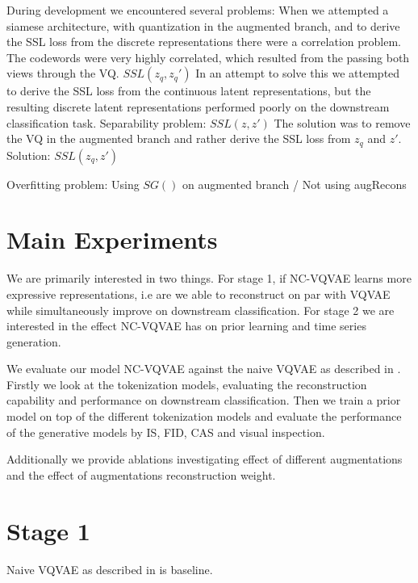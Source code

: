 \documentclass[../../thesis.tex]{subfiles}
\begin{document}
During development we encountered several problems:\newline
When we attempted a siamese architecture, with quantization in the augmented branch, and to derive the SSL loss from the discrete representations there were a correlation problem. The codewords were very highly correlated, which resulted from the passing both views through the VQ.  $SSL(z_q,z_q')$ \newline
In an attempt to solve this we attempted to derive the SSL loss from the continuous latent representations, but the resulting discrete latent representations performed poorly on the downstream classification task. Separability problem: $SSL(z,z')$ \newline
The solution was to remove the VQ in the augmented branch and rather derive the SSL loss from $z_q$ and $z'$. Solution: $SSL(z_q,z')$ \newline

Overfitting problem: Using $SG()$ on augmented branch / Not using augRecons \newline

\section{Main Experiments}

We are primarily interested in two things. For stage 1, if NC-VQVAE learns more expressive representations, i.e are we able to reconstruct on par with VQVAE while simultaneously improve on downstream classification. For stage 2 we are interested in the effect NC-VQVAE has on prior learning and time series generation. \newline

We evaluate our model NC-VQVAE against the naive VQVAE as described in \cite{TimeVQVAE}. Firstly we look at the tokenization models, evaluating the reconstruction capability and performance on downstream classification. Then we train a prior model on top of the different tokenization models and evaluate the performance of the generative models by IS, FID, CAS and visual inspection.\newline

Additionally we provide ablations investigating effect of different augmentations and the effect of augmentations reconstruction weight. \newline

\section{Stage 1}
Naive VQVAE as described in \cite{TimeVQVAE} is baseline.\newline
\end{document}
